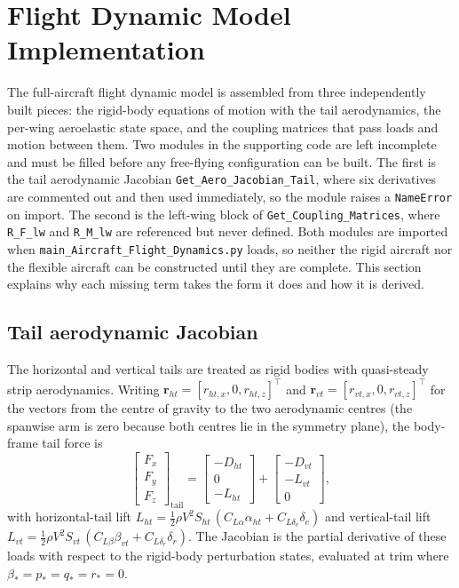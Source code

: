 \newpage

\section{Flight Dynamic Model Implementation}
\label{sec:partB-implementation}

The full-aircraft flight dynamic model is assembled from three independently built pieces: the rigid-body equations of motion with the tail aerodynamics, the per-wing aeroelastic state space, and the coupling matrices that pass loads and motion between them. Two modules in the supporting code are left incomplete and must be filled before any free-flying configuration can be built. The first is the tail aerodynamic Jacobian \texttt{Get\_Aero\_Jacobian\_Tail}, where six derivatives are commented out and then used immediately, so the module raises a \texttt{NameError} on import. The second is the left-wing block of \texttt{Get\_Coupling\_Matrices}, where \texttt{R\_F\_lw} and \texttt{R\_M\_lw} are referenced but never defined. Both modules are imported when \texttt{main\_Aircraft\_Flight\_Dynamics.py} loads, so neither the rigid aircraft nor the flexible aircraft can be constructed until they are complete. This section explains why each missing term takes the form it does and how it is derived.

\subsection{Tail aerodynamic Jacobian}
\label{sec:partB-tail-jacobian}

The horizontal and vertical tails are treated as rigid bodies with quasi-steady strip aerodynamics. Writing $\boldsymbol{r}_{ht}=[r_{ht,x},0,r_{ht,z}]^{\top}$ and $\boldsymbol{r}_{vt}=[r_{vt,x},0,r_{vt,z}]^{\top}$ for the vectors from the centre of gravity to the two aerodynamic centres (the spanwise arm is zero because both centres lie in the symmetry plane), the body-frame tail force is
\begin{equation}
    \begin{bmatrix} F_x \\ F_y \\ F_z \end{bmatrix}_{\text{tail}}
    = \begin{bmatrix} -D_{ht} \\ 0 \\ -L_{ht} \end{bmatrix}
    + \begin{bmatrix} -D_{vt} \\ -L_{vt} \\ 0 \end{bmatrix},
    \label{eq:tail-force}
\end{equation}
with horizontal-tail lift $L_{ht}=\tfrac12\rho V^2 S_{ht}\,(C_{L\alpha}\alpha_{ht}+C_{L\delta_e}\delta_e)$ and vertical-tail lift $L_{vt}=\tfrac12\rho V^2 S_{vt}\,(C_{L\beta}\beta_{vt}+C_{L\delta_r}\delta_r)$. The Jacobian is the partial derivative of these loads with respect to the rigid-body perturbation states, evaluated at trim where $\beta_*=p_*=q_*=r_*=0$.

